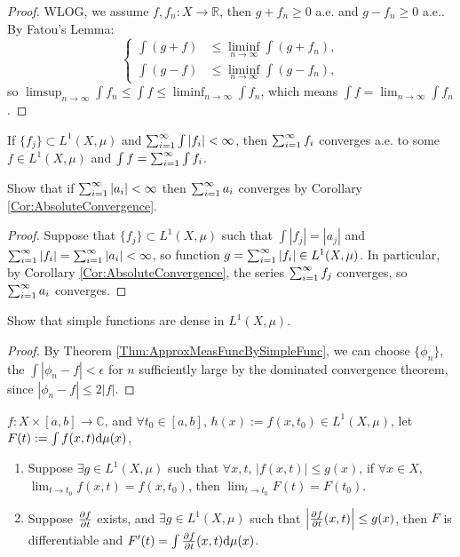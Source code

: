 \begin{proof}
    WLOG, we assume $f,f_{n}:X\rightarrow \mathbb{R}$, 
    then $g+f_n\ge 0$ a.e. and $g-f_n\ge 0$ a.e.. 
    By Fatou's Lemma:
    \begin{displaymath}
        \left\{
            \begin{array}{rl}
                \int (g+f)&\le\liminf_{n\rightarrow\infty}\int(g+f_n),\\
                \int (g-f)&\le\liminf_{n\rightarrow\infty}\int(g-f_{n}),
            \end{array}
        \right.
    \end{displaymath}
    so $\limsup_{n\rightarrow\infty}\int f_{n}\le\int f
    \le\liminf_{n\rightarrow\infty}\int f_{n}$, which means 
    $\int f=\lim_{n\rightarrow\infty}\int f_n$.
\end{proof}
\begin{coro}
    \label{Cor:AbsoluteConvergence}
    If $\{f_{j}\}\subset L^{1}(X,\mu)$ and 
    $\sum_{i=1}^{\infty}\int|f_i|<\infty$, then 
    $\sum_{i=1}^{\infty}f_{i}$ converges a.e. to some $f\in L^{1}(X,\mu)$ 
    and $\int f=\sum_{i=1}^{\infty}\int f_{i}$.
\end{coro}
\begin{exc}
    Show that if $\sum_{i=1}^{\infty}|a_{i}|<\infty$ then 
    $\sum_{i=1}^{\infty}a_{i}$ converges 
    by Corollary \ref{Cor:AbsoluteConvergence}.
\end{exc}
\begin{proof}
    Suppose that $\{f_j\}\subset L^{1}(X,\mu)$ such that $\int|f_j|=|a_j|$
    and $\sum_{i=1}^{\infty}|f_i|=\sum_{i=1}^{\infty}|a_{i}|<\infty$, so function
    $g=\sum_{i=1}^{\infty}|f_i|\in L^{1}(X,\mu)$. In particular, by Corollary
    \ref{Cor:AbsoluteConvergence}, the series $\sum_{i=1}^{\infty}f_j$ converges,
    so $\sum_{i=1}^{\infty}a_{i}$ converges.
\end{proof}
\begin{exc}
    Show that simple functions are 
    dense in $L^{1}(X,\mu)$.
\end{exc}
\begin{proof}
    By Theorem \ref{Thm:ApproxMeasFuncBySimpleFunc}, we can choose
    $\{\phi_n\}$, the $\int|\phi_n-f|<\epsilon$ for $n$ sufficiently
    large by the dominated convergence theorem, since $|\phi_n-f|\leq2|f|$.
\end{proof}
\begin{thm}
    \label{Thm:ChangeOrder}
    $f:X\times[a,b]\rightarrow\mathbb{C}$, and 
    $\forall t_{0}\in[a,b]$, $h(x):=f(x,t_0)\in L^{1}(X,\mu)$, 
    let $F(t):=\int f(x,t)\mathrm{d}\mu(x)$,
    \begin{enumerate}
        \item Suppose $\exists g\in L^{1}(X,\mu)$ such that 
        $\forall x,t$, $|f(x,t)|\le g(x)$, if 
        $\forall x\in X$, $\lim_{t\rightarrow t_{0}}f(x,t)=f(x,t_0)$, 
        then $\lim_{t\rightarrow t_{0}}F(t)=F(t_0)$.
        \item Suppose $\frac{\partial f}{\partial t}$ exists, and 
        $\exists g\in L^{1}(X,\mu)$ such that 
        $\left|\frac{\partial f}{\partial t}(x,t)\right|\le g(x)$, then 
        $F$ is differentiable and 
        $F'(t)=\int\frac{\partial f}{\partial t}(x,t)\mathrm{d}\mu(x)$.
    \end{enumerate}
\end{thm}
